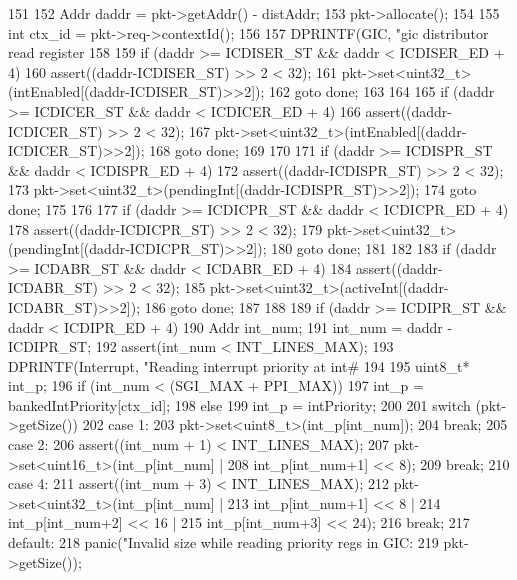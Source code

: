 \begin{DoxyCode}
151 {
152     Addr daddr = pkt->getAddr() - distAddr;
153     pkt->allocate();
154 
155     int ctx_id = pkt->req->contextId();
156 
157     DPRINTF(GIC, "gic distributor read register %
158 
159     if (daddr >= ICDISER_ST && daddr < ICDISER_ED + 4) {
160         assert((daddr-ICDISER_ST) >> 2 < 32);
161         pkt->set<uint32_t>(intEnabled[(daddr-ICDISER_ST)>>2]);
162         goto done;
163     }
164 
165     if (daddr >= ICDICER_ST && daddr < ICDICER_ED + 4) {
166         assert((daddr-ICDICER_ST) >> 2 < 32);
167         pkt->set<uint32_t>(intEnabled[(daddr-ICDICER_ST)>>2]);
168         goto done;
169     }
170 
171     if (daddr >= ICDISPR_ST && daddr < ICDISPR_ED + 4) {
172         assert((daddr-ICDISPR_ST) >> 2 < 32);
173         pkt->set<uint32_t>(pendingInt[(daddr-ICDISPR_ST)>>2]);
174         goto done;
175     }
176 
177     if (daddr >= ICDICPR_ST && daddr < ICDICPR_ED + 4) {
178         assert((daddr-ICDICPR_ST) >> 2 < 32);
179         pkt->set<uint32_t>(pendingInt[(daddr-ICDICPR_ST)>>2]);
180         goto done;
181     }
182 
183     if (daddr >= ICDABR_ST && daddr < ICDABR_ED + 4) {
184         assert((daddr-ICDABR_ST) >> 2 < 32);
185         pkt->set<uint32_t>(activeInt[(daddr-ICDABR_ST)>>2]);
186         goto done;
187     }
188 
189     if (daddr >= ICDIPR_ST && daddr < ICDIPR_ED + 4) {
190         Addr int_num;
191         int_num = daddr - ICDIPR_ST;
192         assert(int_num < INT_LINES_MAX);
193         DPRINTF(Interrupt, "Reading interrupt priority at int# %
194 
195         uint8_t* int_p;
196         if (int_num < (SGI_MAX + PPI_MAX))
197             int_p = bankedIntPriority[ctx_id];
198         else
199             int_p = intPriority;
200 
201         switch (pkt->getSize()) {
202           case 1:
203             pkt->set<uint8_t>(int_p[int_num]);
204             break;
205           case 2:
206             assert((int_num + 1) < INT_LINES_MAX);
207             pkt->set<uint16_t>(int_p[int_num] |
208                                int_p[int_num+1] << 8);
209             break;
210           case 4:
211             assert((int_num + 3) < INT_LINES_MAX);
212             pkt->set<uint32_t>(int_p[int_num] |
213                                int_p[int_num+1] << 8 |
214                                int_p[int_num+2] << 16 |
215                                int_p[int_num+3] << 24);
216             break;
217           default:
218             panic("Invalid size while reading priority regs in GIC: %
219                    pkt->getSize());
}}}
\end{DoxyCode}
